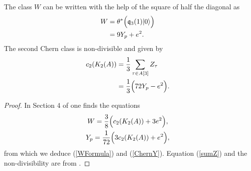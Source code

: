 \begin{proposition}
The class $W$ can be written with the help of the square of half the diagonal as
\begin{align} 
W &= \theta^*\Big( \mathfrak{q}_3(1)|0\rangle \Big) \\
\label{WFormula}
&= 9 Y_p + e^2.
\end{align}
The second Chern class is non-divisible and given by 
\begin{align}
\label{sumZ}
c_2(K_{ 2 }( A )) &= \frac{1}{3}\sum_{\tau\in A[3] } Z_\tau \\
\label{ChernY}
&= \frac{1}{3} \Big(72Y_p-e^2 \Big). 
\end{align}
\end{proposition}
\begin{proof} 
In Section 4 of \cite{Hassett} one finds the equations
\begin{gather}
W = \frac{3}{8}\Big(c_2(K_{ 2 }( A )) + 3e^2\Big),\label{WW} \\
Y_p = \frac{1}{72}\Big(3c_2(K_{ 2 }( A )) + e^2\Big),
\end{gather}
from which we deduce (\ref{WFormula}) and (\ref{ChernY}).
Equation (\ref{sumZ}) and the non-divisibility are from \cite[Proposition 5.1]{Hassett}.
\end{proof}


